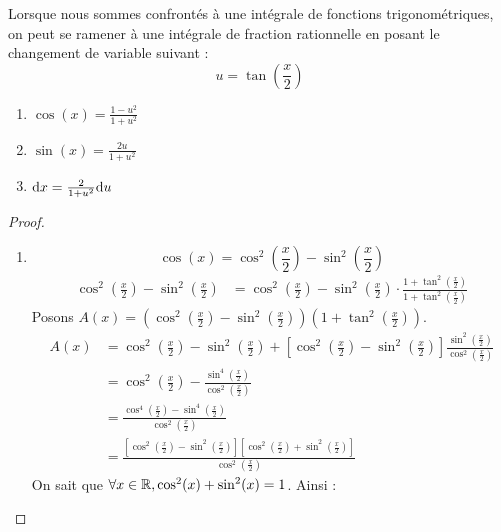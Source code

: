 Lorsque nous sommes confrontés à une intégrale de fonctions trigonométriques, on peut se ramener à une intégrale de fraction rationnelle en posant le changement de variable suivant :
\[ u = \tan(\frac{x}{2}) \]
\begin{multicols}{3}
    \begin{enumerate}
        \item $\cos(x) = \frac{1 - u^2}{1 + u^2}$
        \item $\sin(x) = \frac{2u}{1 + u^2}$
        \item $\diffd x = \frac{2}{1 + u^2} \diffd u$
    \end{enumerate}
\end{multicols}
\begin{proof}
    \begin{enumerate}
        \item \[ \cos(x) = \cos^2\left( \frac{x}{2} \right) - \sin^2\left( \frac{x}{2} \right) \]
            \begin{align*}
                \cos^2\left( \frac{x}{2} \right) - \sin^2\left( \frac{x}{2} \right) &= \cos^2\left( \frac{x}{2} \right) - \sin^2\left( \frac{x}{2} \right) \cdot \frac{1 + \tan^2 \left( \frac{x}{2} \right)}{1 + \tan^2 \left( \frac{x}{2} \right)}
            \end{align*}
            Posons $A(x) = \left( \cos^2\left( \frac{x}{2} \right) - \sin^2\left( \frac{x}{2} \right) \right) \left( 1 + \tan^2\left( \frac{x}{2} \right) \right)$.
            \begin{align*}
                A(x) &= \cos^2\left( \frac{x}{2} \right) - \sin^2\left( \frac{x}{2} \right) + \left[ \cos^2\left( \frac{x}{2} \right) - \sin^2\left( \frac{x}{2} \right) \right] \frac{\sin^2 \left( \frac{x}{2} \right)}{\cos^2 \left( \frac{x}{2} \right)} \\
                &= \cos^2 \left( \frac{x}{2} \right) - \frac{\sin^4 \left( \frac{x}{2} \right)}{\cos^2 \left( \frac{x}{2} \right)} \\
                &= \frac{\cos^4 \left( \frac{x}{2} \right) - \sin^4 \left( \frac{x}{2} \right)}{\cos^2 \left( \frac{x}{2} \right)}\\
                &= \frac{\left[ \cos^2\left( \frac{x}{2} \right) - \sin^2 \left( \frac{x}{2} \right) \right] \left[ \cos^2\left( \frac{x}{2} \right) + \sin^2 \left( \frac{x}{2} \right) \right]}{\cos^2 \left( \frac{x}{2} \right)}
            \end{align*}
             On sait que $\forall x \in \mathbb{R}, \cos^2(x) + \sin^2(x) = 1$.
             Ainsi : 

\end{enumerate}
\end{proof}
